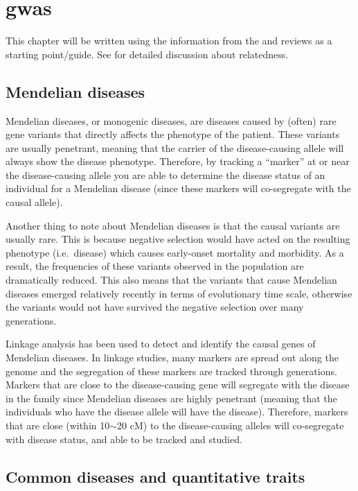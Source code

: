 \chapter{\Gls{gwas}}
\label{cha:gwas}

This chapter will be written using the information from the \citet{Hirschhorn2005} and \citet{McCarthy2008} reviews as a starting point/guide.
See \citet{Astle2009} for detailed discussion about relatedness.

\section{Mendelian diseases}
\label{sec:mendelian_diseases}

Mendelian diseases, or monogenic diseases, are diseases caused by (often) rare gene variants that directly affects the phenotype of the patient.
These variants are usually penetrant, meaning that the carrier of the disease-causing allele will always show the disease phenotype.
Therefore, by tracking a ``marker'' at or near the disease-causing allele you are able to determine the disease status of an individual for a Mendelian disease (since these markers will co-segregate with the causal allele).

Another thing to note about Mendelian diseases is that the causal variants are usually rare.
This is because negative selection would have acted on the resulting phenotype (i.e.\ disease) which causes early-onset mortality and morbidity.
As a result, the frequencies of these variants observed in the population are dramatically reduced.
This also means that the variants that cause Mendelian diseases emerged relatively recently in terms of evolutionary time scale, otherwise the variants would not have survived the negative selection over many generations.

Linkage analysis has been used to detect and identify the causal genes of Mendelian diseases.
In linkage studies, many markers are spread out along the genome and the segregation of these markers are tracked through generations.
Markers that are close to the disease-causing gene will segregate with the disease in the family since Mendelian diseases are highly penetrant (meaning that the individuals who have the disease allele will have the disease).
Therefore, markers that are close (within 10$\sim$20 cM) to  the disease-causing alleles will co-segregate with disease status, and able to be tracked and studied.

\section{Common diseases and quantitative traits}
\label{sec:common_diseases_and_quantitative_traits}

